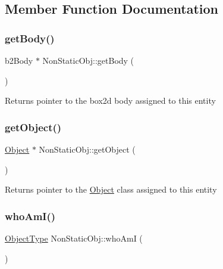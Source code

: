 \subsection{Member Function Documentation}
\mbox{\label{class_non_static_obj_a55713a3f848d7629176398333e84a015}} 
\subsubsection{\texorpdfstring{get\+Body()}{getBody()}}
{\footnotesize\ttfamily b2\+Body $\ast$ Non\+Static\+Obj\+::get\+Body (\begin{DoxyParamCaption}{ }\end{DoxyParamCaption})}

\begin{DoxyReturn}{Returns}
pointer to the box2d body assigned to this entity 
\end{DoxyReturn}
\mbox{\label{class_non_static_obj_abdf0a375a987d99795bd298a1c84940c}} 
\subsubsection{\texorpdfstring{get\+Object()}{getObject()}}
{\footnotesize\ttfamily \hyperlink{class_object}{Object} $\ast$ Non\+Static\+Obj\+::get\+Object (\begin{DoxyParamCaption}{ }\end{DoxyParamCaption})}

\begin{DoxyReturn}{Returns}
pointer to the \hyperlink{class_object}{Object} class assigned to this entity 
\end{DoxyReturn}
\mbox{\label{class_non_static_obj_a01e6db05d41ec62cb5c258b5069b083e}} 
\subsubsection{\texorpdfstring{who\+Am\+I()}{whoAmI()}}
{\footnotesize\ttfamily \hyperlink{_non_static_obj_8h_a842c5e2e69277690b064bf363c017980}{Object\+Type} Non\+Static\+Obj\+::who\+AmI (\begin{DoxyParamCaption}{ }\end{DoxyParamCaption})}



